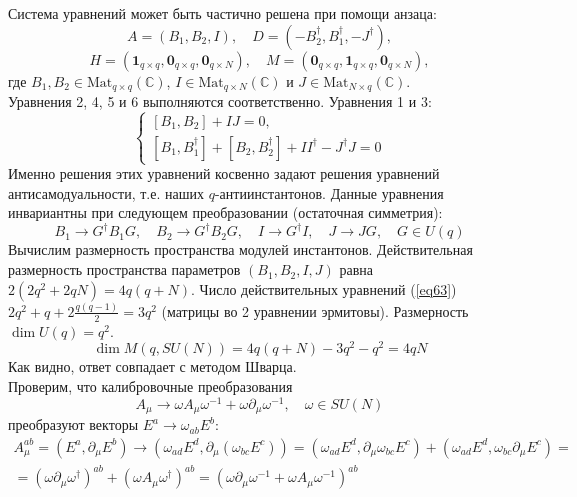 \documentclass[12pt]{article}
\theoremstyle{definition}
\begin{document}
Система уравнений может быть частично решена при помощи анзаца:
\begin{equation}
    A=(B_1,B_2,I),\quad D=(-B_2^\dagger,B_1^\dagger,-J^\dagger),
\end{equation}
\begin{equation}
    H=(\bm{1}_{q\times q},\bm{0}_{q\times q},\bm{0}_{q\times N}),\quad M=(\bm{0}_{q\times q},\bm{1}_{q\times q},\bm{0}_{q\times N}),
\end{equation}
где $B_1,B_2\in\text{Mat}_{q\times q}(\mathbb{C})$, $I\in\text{Mat}_{q\times N}(\mathbb{C})$ и $J\in\text{Mat}_{N\times q}(\mathbb{C})$.\\
Уравнения 2, 4, 5 и 6 выполняются соответственно. Уравнения 1 и 3:
\begin{equation}\label{eq63}
    \begin{cases}
        [B_1,B_2]+IJ=0,\\
        [B_1,B^\dagger_1]+[B_2,B^\dagger_2]+II^\dagger-J^\dagger J=0
    \end{cases}
\end{equation}
Именно решения этих уравнений косвенно задают решения уравнений антисамодуальности, т.е. наших $q$-антиинстантонов. Данные уравнения инвариантны при следующем преобразовании (остаточная симметрия):
\begin{equation}
    B_1\rightarrow G^\dagger B_1G,\quad B_2\rightarrow G^\dagger B_2G,\quad I\rightarrow G^\dagger I,\quad J\rightarrow JG,\quad G\in U(q)
\end{equation}
Вычислим размерность пространства модулей инстантонов. Действительная размерность пространства параметров $(B_1,B_2,I,J)$ равна $2(2q^2+2qN)=4q(q+N)$. Число действительных уравнений (\ref{eq63}) $2q^2+q+2\frac{q(q-1)}{2}=3q^2$ (матрицы во 2 уравнении эрмитовы). Размерность $\dim U(q)=q^2$.
\begin{equation}
    \dim M(q,SU(N))=4q(q+N)-3q^2-q^2=4qN
\end{equation}
Как видно, ответ совпадает с методом Шварца.\\
Проверим, что калибровочные преобразования
\begin{equation}
    A_\mu\rightarrow\omega A_\mu\omega^{-1}+\omega\partial_\mu\omega^{-1},\quad\omega\in SU(N)
\end{equation}
преобразуют векторы $E^a\rightarrow\omega_{ab}E^b$:
\begin{multline}
    A^{ab}_\mu=(E^a,\partial_\mu E^b)\rightarrow(\omega_{ad}E^d,\partial_\mu(\omega_{bc} E^c))=(\omega_{ad}E^d,\partial_\mu\omega_{bc} E^c)+(\omega_{ad}E^d,\omega_{bc}\partial_\mu E^c)=\\=(\omega\partial_\mu\omega^\dagger)^{ab}+(\omega A_\mu\omega^\dagger)^{ab}=(\omega\partial_\mu\omega^{-1}+\omega A_\mu\omega^{-1})^{ab}
\end{multline}
\end{document}
